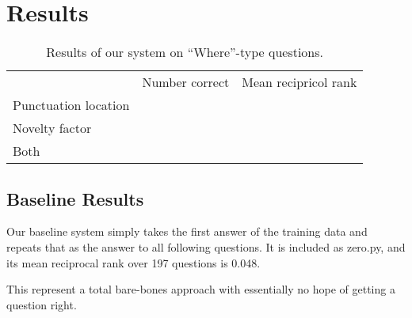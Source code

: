 \documentclass{article}
\begin{document}
\section{Results}
\begin{table}
\begin{tabular}{lcc}
\cmidrule{2-3}
                     & Number correct & Mean recipricol rank\\
\cmidrule{2-3}
Punctuation location &                &                     \\
Novelty factor       &                &                     \\
Both                 &                &                     \\
\cmidrule{2-3}
\end{tabular}
\caption{\label{tab:results}Results of our system on ``Where''-type questions. }
\end{table}

\subsection{Baseline Results}
Our baseline system simply takes the first answer of the training data and
repeats that as the answer to all following questions. It is included as
zero.py, and its mean reciprocal rank over 197 questions is 0.048.  

This represent a total bare-bones approach with essentially no hope of getting a
question right.
\end{document}
